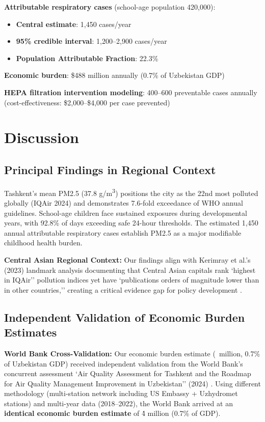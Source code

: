 \documentclass[11pt,a4paper]{article}
\begin{document}
\textbf{Attributable respiratory cases} (school-age population 420,000):
\begin{itemize}
    \item \textbf{Central estimate}: 1,450 cases/year
    \item \textbf{95\% credible interval}: 1,200--2,900 cases/year
    \item \textbf{Population Attributable Fraction}: 22.3\%
\end{itemize}

\textbf{Economic burden}: \$488 million annually (0.7\% of Uzbekistan GDP)

\textbf{HEPA filtration intervention modeling}: 400--600 preventable cases annually (cost-effectiveness: \$2,000--\$4,000 per case prevented)

\section{Discussion}

\subsection{Principal Findings in Regional Context}

Tashkent's mean PM2.5 (37.8 \textmu g/m\textsuperscript{3}) positions the city as the 22nd most polluted globally (IQAir 2024) and demonstrates 7.6-fold exceedance of WHO annual guidelines. School-age children face sustained exposures during developmental years, with 92.8\% of days exceeding safe 24-hour thresholds. The estimated 1,450 annual attributable respiratory cases establish PM2.5 as a major modifiable childhood health burden.

\textbf{Central Asian Regional Context:} Our findings align with Kerimray et al.'s (2023) landmark analysis documenting that Central Asian capitals rank `highest in IQAir'' pollution indices yet have `publications orders of magnitude lower than in other countries,'' creating a critical evidence gap for policy development \citep{kerimray2023cities}.

\subsection{Independent Validation of Economic Burden Estimates}

\textbf{World Bank Cross-Validation:} Our economic burden estimate (\ million, 0.7\% of Uzbekistan GDP) received independent validation from the World Bank's concurrent assessment `Air Quality Assessment for Tashkent and the Roadmap for Air Quality Management Improvement in Uzbekistan'' (2024) \citep{worldbank2024tashkent}. Using different methodology (multi-station network including US Embassy + Uzhydromet stations) and multi-year data (2018--2022), the World Bank arrived at an \textbf{identical economic burden estimate} of \.4 million (0.7\% of GDP).
\end{document}
